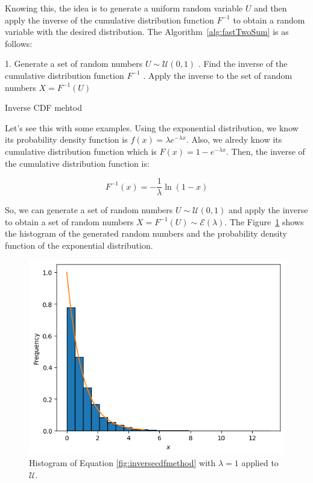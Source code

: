 \documentclass{report}
\begin{document}
Knowing this, the idea is to generate a uniform random variable \(U\) and then apply the inverse of the cumulative distribution function \(F^{-1}\) to obtain a random variable with the desired distribution. The Algorithm~\ref{alg:fastTwoSum} is as follows:

\begin{center}
	\begin{minipage}{0.7\linewidth} %
		\begin{algorithm}[H]
			1. Generate a set of random numbers \(U \sim \mathcal{U}(0,1)\) . Find the inverse of the cumulative distribution function \(F^{-1}\) . Apply the inverse to the set of random numbers \(X = F^{-1}(U)\) \;
			\caption{Inverse CDF mehtod} %
			\label{alg:fastTwoSum}   %
		\end{algorithm}
	\end{minipage}
\end{center}

Let's see this with some examples. Using the exponential distribution, we know its probability density function is \(f(x) = \lambda e^{-\lambda x}\).  Also, we alredy know its cumulative distribution function which is \(F(x) = 1 - e^{-\lambda x}\). Then, the inverse of the cumulative distribution function is:

\begin{equation}\label{eq:inversecdf} F^{-1}(x)  = -\frac{1}{\lambda} \ln(1-x) \end{equation}

So, we can generate a set of random numbers \(U \sim \mathcal{U}(0,1)\) and apply the inverse to obtain a set of random numbers \(X = F^{-1}(U) \sim \mathcal{E}(\lambda)\). The Figure~\ref{fig:inversecdfmethod} shows the histogram of the generated random numbers and the probability density function of the exponential distribution.

\begin{figure}[H]
	\centering
	\includegraphics[width=0.5\linewidth]{./Figures/InverseCDF/histogram.png}
	\caption{Histogram of Equation \eqref{fig:inversecdfmethod} with \(\lambda = 1\) applied to \(\mathcal{U}\).}
	\label{fig:inversecdfmethod}
\end{figure}
\end{document}
